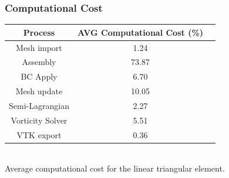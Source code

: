 
\begin{frame}
 \frametitle{\LARGE Computational Cost}

\begin{table}[H]
\centering
\begin{tabular}{ccc}
\hline
\textbf{Process} & \textbf{AVG Computational Cost} (\%) \\[0.5ex]
\hline\hline
Mesh import & 1.24 \\
Assembly & 73.87 \\
BC Apply & 6.70 \\
Mesh update & 10.05 \\
Semi-Lagrangian & 2.27 \\
Vorticity Solver & 5.51 \\
VTK export & 0.36 \\
\hline
\end{tabular}\\[0.3cm]
Average computational cost for the linear triangular element.
\label{time ratio}
\end{table}




\end{frame}



